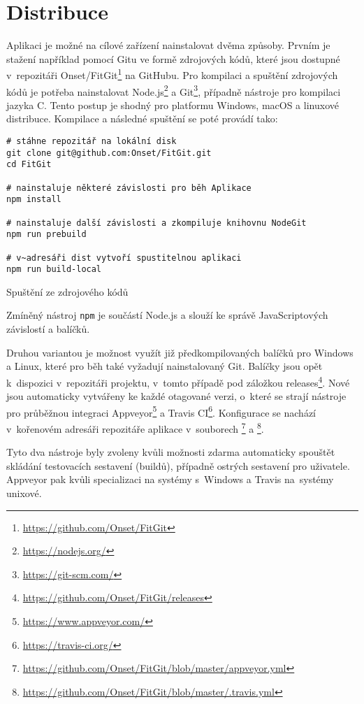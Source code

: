 \chapter{Distribuce}

Aplikaci je možné na cílové zařízení nainstalovat dvěma způsoby. Prvním je stažení například pomocí Gitu ve formě zdrojových kódů, které jsou dostupné v~repozitáři Onset/FitGit\footnote{\url{https://github.com/Onset/FitGit}} na GitHubu. Pro kompilaci a spuštění zdrojových kódů je potřeba nainstalovat Node.js\footnote{\url{https://nodejs.org/}} a Git\footnote{\url{https://git-scm.com/}}, případně nástroje pro kompilaci jazyka C. Tento postup je shodný pro platformu Windows, macOS a linuxové distribuce. Kompilace a následné spuštění se poté provádí tako:

\FloatBarrier
\begin{listing}[ht]
	\begin{verbatim}
# stáhne repozitář na lokální disk
git clone git@github.com:Onset/FitGit.git
cd FitGit

# nainstaluje některé závislosti pro běh Aplikace
npm install

# nainstaluje další závislosti a zkompiluje knihovnu NodeGit
npm run prebuild

# v~adresáři dist vytvoří spustitelnou aplikaci
npm run build-local
	\end{verbatim}
	\caption{Spuštění ze zdrojového kódů}
\end{listing}
\FloatBarrier

Zmíněný nástroj \texttt{npm} je součástí Node.js a slouží ke správě JavaScriptových závislostí a balíčků.

Druhou variantou je možnost využít již předkompilovaných balíčků pro Windows a Linux, které pro běh také vyžadují nainstalovaný Git. Balíčky jsou opět k~dispozici v~repozitáři projektu, v~tomto případě pod záložkou releases\footnote{\url{https://github.com/Onset/FitGit/releases}}. Nové jsou automaticky vytvářeny ke každé otagované verzi, o~které se strají nástroje pro průběžnou integraci Appveyor\footnote{\url{https://www.appveyor.com/}} a Travis CI\footnote{\url{https://travis-ci.org/}}. Konfigurace se nachází v~kořenovém adresáři repozitáře aplikace v~souborech \footnote{\url{https://github.com/Onset/FitGit/blob/master/appveyor.yml}} a \footnote{\url{https://github.com/Onset/FitGit/blob/master/.travis.yml}}.

Tyto dva nástroje byly zvoleny kvůli možnosti zdarma automaticky spouštět skládání testovacích sestavení (buildů), případně ostrých sestavení pro uživatele. Appveyor pak kvůli specializaci na systémy s~Windows a Travis na~systémy unixové.

